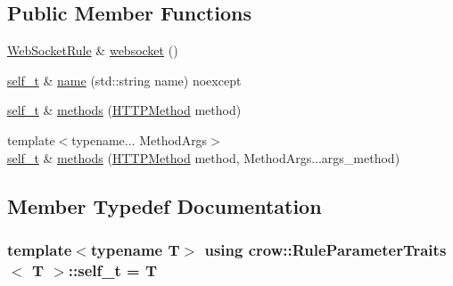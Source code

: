 \subsection*{Public Member Functions}
\begin{DoxyCompactItemize}
\item 
\hyperlink{classcrow_1_1_web_socket_rule}{Web\-Socket\-Rule} \& \hyperlink{structcrow_1_1_rule_parameter_traits_ac4d5caadbace83369da53cd8454c7cfa}{websocket} ()
\item 
\hyperlink{structcrow_1_1_rule_parameter_traits_aa408e9880526bcb494f3600077a9cee2}{self\-\_\-t} \& \hyperlink{structcrow_1_1_rule_parameter_traits_aa330efc6368bb7b66901122f1e8e4943}{name} (std\-::string name) noexcept
\item 
\hyperlink{structcrow_1_1_rule_parameter_traits_aa408e9880526bcb494f3600077a9cee2}{self\-\_\-t} \& \hyperlink{structcrow_1_1_rule_parameter_traits_a0c4d4d6919377ea393aa2f02b844f555}{methods} (\hyperlink{namespacecrow_a02d34072d2b3415aee5e7287edd06ae1}{H\-T\-T\-P\-Method} method)
\item 
{\footnotesize template$<$typename... Method\-Args$>$ }\\\hyperlink{structcrow_1_1_rule_parameter_traits_aa408e9880526bcb494f3600077a9cee2}{self\-\_\-t} \& \hyperlink{structcrow_1_1_rule_parameter_traits_ad134f97c2c0faae9fa1229507b3b67bb}{methods} (\hyperlink{namespacecrow_a02d34072d2b3415aee5e7287edd06ae1}{H\-T\-T\-P\-Method} method, Method\-Args...\-args\-\_\-method)
\end{DoxyCompactItemize}


\subsection{Member Typedef Documentation}
\hypertarget{structcrow_1_1_rule_parameter_traits_aa408e9880526bcb494f3600077a9cee2}{
\subsubsection[{self\-\_\-t}]{\setlength{\rightskip}{0pt plus 5cm}template$<$typename T$>$ using {\bf crow\-::\-Rule\-Parameter\-Traits}$<$ T $>$\-::{\bf self\-\_\-t} =  T}}\label{structcrow_1_1_rule_parameter_traits_aa408e9880526bcb494f3600077a9cee2}


